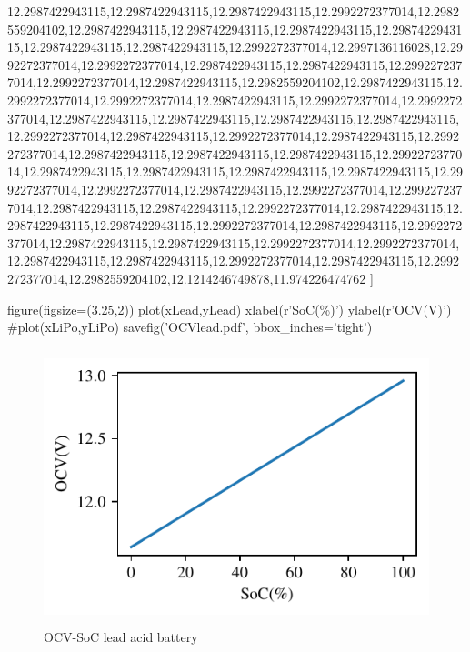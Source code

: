 \begin{pylabcode}[plotsession]
12.2987422943115,12.2987422943115,12.2987422943115,12.2992272377014,12.2982559204102,12.2987422943115,12.2987422943115,12.2987422943115,12.2987422943115,12.2987422943115,12.2987422943115,12.2992272377014,12.2997136116028,12.2992272377014,12.2992272377014,12.2987422943115,12.2987422943115,12.2992272377014,12.2992272377014,12.2987422943115,12.2982559204102,12.2987422943115,12.2992272377014,12.2992272377014,12.2987422943115,12.2992272377014,12.2992272377014,12.2987422943115,12.2987422943115,12.2987422943115,12.2987422943115,12.2992272377014,12.2987422943115,12.2992272377014,12.2987422943115,12.2992272377014,12.2987422943115,12.2987422943115,12.2987422943115,12.2992272377014,12.2987422943115,12.2987422943115,12.2987422943115,12.2987422943115,12.2992272377014,12.2992272377014,12.2987422943115,12.2992272377014,12.2992272377014,12.2987422943115,12.2987422943115,12.2992272377014,12.2987422943115,12.2987422943115,12.2987422943115,12.2992272377014,12.2987422943115,12.2992272377014,12.2987422943115,12.2987422943115,12.2992272377014,12.2992272377014,12.2987422943115,12.2987422943115,12.2992272377014,12.2987422943115,12.2992272377014,12.2982559204102,12.1214246749878,11.974226474762 ]
    
    

 
figure(figsize=(3.25,2))
plot(xLead,yLead)
xlabel(r'SoC(\%)')
ylabel(r'OCV(V)')
#plot(xLiPo,yLiPo)
savefig('OCVlead.pdf', bbox_inches='tight')
\end{pylabcode}

\begin{figure}
\centering
\includegraphics[height=8cm]{OCVlead}
\caption{\label{fig:OCVLead} OCV-SoC lead acid battery }
\end{figure}



